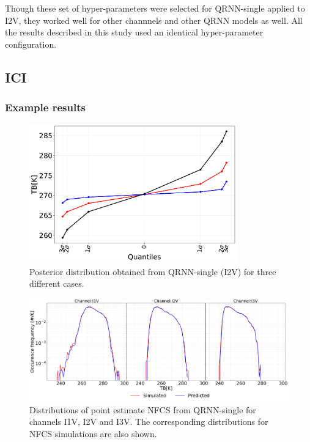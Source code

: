 \documentclass[amt, manuscript]{copernicus}
\begin{document}
Though these set of hyper-parameters were selected for QRNN-single applied to I2V, they worked well for other channnels and other QRNN models as well. All the results described in this study used an identical hyper-parameter configuration.


\subsection{ICI}
\subsubsection{Example results}
%
\begin{figure}[t]
	\centering
	\includegraphics[height=60mm]{Figures/posterior_distribution_I2V.pdf} 
	\caption{Posterior distribution obtained from QRNN-single (I2V) for three different cases. }
	\label{fig:posterior_distribution_I2V}	
\end{figure}
\begin{figure}[t]
	\includegraphics[width=\textwidth]{Figures/PDF_predictions_ICI.pdf} 
	\caption{Distributions of point estimate NFCS from QRNN-single for channels I1V, I2V and I3V. The corresponding distributions for NFCS simulations are also shown.}
	\label{fig:PDF_predictions}	
\end{figure}
\end{document}
